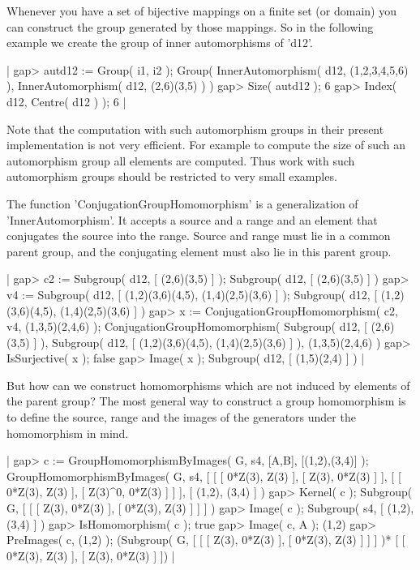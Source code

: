 Whenever you have a set of bijective mappings on a finite set (or domain)
you can construct  the  group generated  by those mappings.   So  in  the
following example we create the group of inner automorphisms of 'd12'.

|    gap> autd12 := Group( i1, i2 );
    Group( InnerAutomorphism( d12,
    (1,2,3,4,5,6) ), InnerAutomorphism( d12, (2,6)(3,5) ) )
    gap> Size( autd12 );
    6
    gap> Index( d12, Centre( d12 ) );
    6 |

Note that the computation with such automorphism  groups in their present
implementation is not very efficient.  For example to compute the size of
such  an  automorphism group  all elements  are computed.  Thus work with
such automorphism groups should be restricted to very small examples.

The  function  'ConjugationGroupHomomorphism'  is  a   generalization  of
'InnerAutomorphism'.  It accepts a source and a range and an element that
conjugates the source  into the range.   Source and range must  lie in  a
common parent group, and the conjugating element must  also lie  in  this
parent group.

|    gap> c2 := Subgroup( d12, [ (2,6)(3,5) ] );
    Subgroup( d12, [ (2,6)(3,5) ] )
    gap> v4 := Subgroup( d12, [ (1,2)(3,6)(4,5), (1,4)(2,5)(3,6) ] );
    Subgroup( d12, [ (1,2)(3,6)(4,5), (1,4)(2,5)(3,6) ] )
    gap> x := ConjugationGroupHomomorphism( c2, v4, (1,3,5)(2,4,6) );
    ConjugationGroupHomomorphism( Subgroup( d12,
    [ (2,6)(3,5) ] ), Subgroup( d12, [ (1,2)(3,6)(4,5), (1,4)(2,5)(3,6)
     ] ), (1,3,5)(2,4,6) )
    gap> IsSurjective( x );
    false
    gap> Image( x );
    Subgroup( d12, [ (1,5)(2,4) ] ) |

But how  can we construct homomorphisms which are not induced by elements
of  the  parent  group?   The  most  general  way  to  construct a  group
homomorphism is  to define the  source,  range  and  the  images  of  the
generators under the homomorphism in mind.

|    gap> c := GroupHomomorphismByImages( G, s4, [A,B], [(1,2),(3,4)] );
    GroupHomomorphismByImages( G, s4,
    [ [ [ 0*Z(3), Z(3) ], [ Z(3), 0*Z(3) ] ],
      [ [ 0*Z(3), Z(3) ], [ Z(3)^0, 0*Z(3) ] ] ], [ (1,2), (3,4) ] )
    gap> Kernel( c );
    Subgroup( G, [ [ [ Z(3), 0*Z(3) ], [ 0*Z(3), Z(3) ] ] ] )
    gap> Image( c );
    Subgroup( s4, [ (1,2), (3,4) ] )
    gap> IsHomomorphism( c );
    true
    gap> Image( c, A );
    (1,2)
    gap> PreImages( c, (1,2) );
    (Subgroup( G, [ [ [ Z(3), 0*Z(3) ], [ 0*Z(3), Z(3) ] ] ] )*
    [ [ 0*Z(3), Z(3) ], [ Z(3), 0*Z(3) ] ]) |

